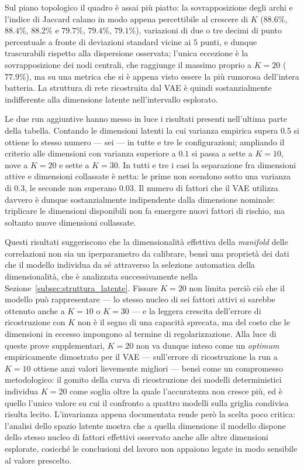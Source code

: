 Sul piano topologico il quadro è assai più piatto: la sovrapposizione degli archi e l'indice di Jaccard calano in modo appena percettibile al crescere di $K$ ($88.6\%$, $88.4\%$, $88.2\%$ e $79.7\%$, $79.4\%$, $79.1\%$), variazioni di due o tre decimi di punto percentuale a fronte di deviazioni standard vicine ai $5$ punti, e dunque trascurabili rispetto alla dispersione osservata; l'unica eccezione è la sovrapposizione dei nodi centrali, che raggiunge il massimo proprio a $K=20$ ($77.9\%$), ma su una metrica che si è appena visto essere la più rumorosa dell'intera batteria. La struttura di rete ricostruita dal VAE è quindi sostanzialmente indifferente alla dimensione latente nell'intervallo esplorato.

Le due run aggiuntive hanno messo in luce i risultati presenti nell'ultima parte della tabella. Contando le dimensioni latenti la cui varianza empirica supera $0.5$ si ottiene lo stesso numero --- sei --- in tutte e tre le configurazioni; ampliando il criterio alle dimensioni con varianza superiore a $0.1$ si passa a sette a $K=10$, nove a $K=20$ e sette a $K=30$. In tutti e tre i casi la separazione fra dimensioni attive e dimensioni collassate è netta: le prime non scendono sotto una varianza di $0.3$, le seconde non superano $0.03$. Il numero di fattori che il VAE utilizza davvero è dunque sostanzialmente indipendente dalla dimensione nominale: triplicare le dimensioni disponibili non fa emergere nuovi fattori di rischio, ma soltanto nuove dimensioni collassate.

Questi risultati suggeriscono che la dimensionalità effettiva della \emph{manifold} delle correlazioni non sia un iperparametro da calibrare, bensì una proprietà dei dati che il modello individua da sé attraverso la selezione automatica della dimensionalità, che è analizzata successivamente nella Sezione~\ref{subsec:struttura_latente}. Fissare $K=20$ non limita perciò ciò che il modello può rappresentare --- lo stesso nucleo di sei fattori attivi si sarebbe ottenuto anche a $K=10$ o $K=30$ --- e la leggera crescita dell'errore di ricostruzione con $K$ non è il segno di una capacità sprecata, ma del costo che le dimensioni in eccesso impongono al termine di regolarizzazione. Alla luce di queste prove supplementari, $K=20$ non va dunque inteso come un \emph{optimum} empiricamente dimostrato per il VAE --- sull'errore di ricostruzione la run a $K=10$ ottiene anzi valori lievemente migliori --- bensì come un compromesso metodologico: il gomito della curva di ricostruzione dei modelli deterministici individua $K=20$ come soglia oltre la quale l'accuratezza non cresce più, ed è quello l'unico valore su cui il confronto a quattro modelli sulla griglia condivisa risulta lecito. L'invarianza appena documentata rende però la scelta poco critica: l'analisi dello spazio latente mostra che a quella dimensione il modello dispone dello stesso nucleo di fattori effettivi osservato anche alle altre dimensioni esplorate, cosicché le conclusioni del lavoro non appaiono legate in modo sensibile al valore prescelto.

